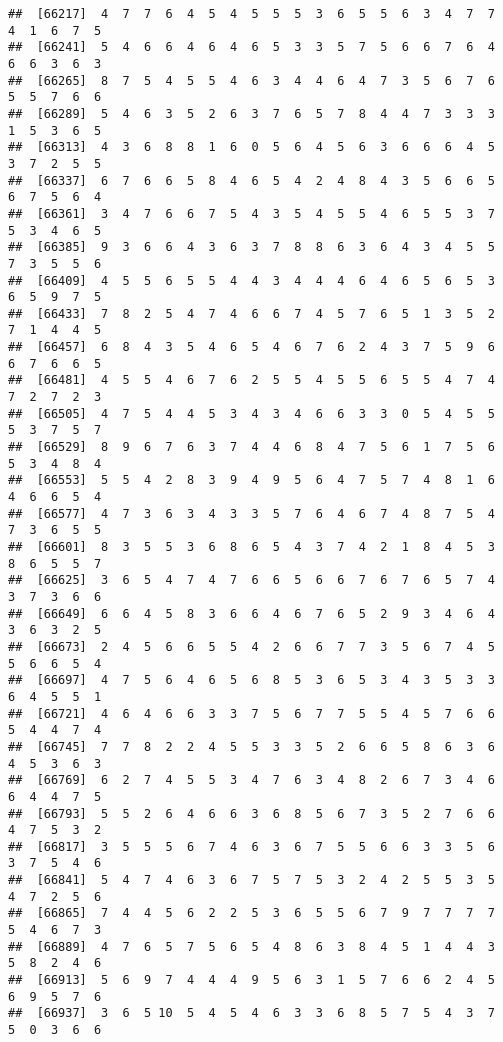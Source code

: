 \documentclass[
]{book}
\begin{document}
\begin{verbatim}
##  [66217]  4  7  7  6  4  5  4  5  5  5  3  6  5  5  6  3  4  7  7  4  1  6  7  5
##  [66241]  5  4  6  6  4  6  4  6  5  3  3  5  7  5  6  6  7  6  4  6  6  3  6  3
##  [66265]  8  7  5  4  5  5  4  6  3  4  4  6  4  7  3  5  6  7  6  5  5  7  6  6
##  [66289]  5  4  6  3  5  2  6  3  7  6  5  7  8  4  4  7  3  3  3  1  5  3  6  5
##  [66313]  4  3  6  8  8  1  6  0  5  6  4  5  6  3  6  6  6  4  5  3  7  2  5  5
##  [66337]  6  7  6  6  5  8  4  6  5  4  2  4  8  4  3  5  6  6  5  6  7  5  6  4
##  [66361]  3  4  7  6  6  7  5  4  3  5  4  5  5  4  6  5  5  3  7  5  3  4  6  5
##  [66385]  9  3  6  6  4  3  6  3  7  8  8  6  3  6  4  3  4  5  5  7  3  5  5  6
##  [66409]  4  5  5  6  5  5  4  4  3  4  4  4  6  4  6  5  6  5  3  6  5  9  7  5
##  [66433]  7  8  2  5  4  7  4  6  6  7  4  5  7  6  5  1  3  5  2  7  1  4  4  5
##  [66457]  6  8  4  3  5  4  6  5  4  6  7  6  2  4  3  7  5  9  6  6  7  6  6  5
##  [66481]  4  5  5  4  6  7  6  2  5  5  4  5  5  6  5  5  4  7  4  7  2  7  2  3
##  [66505]  4  7  5  4  4  5  3  4  3  4  6  6  3  3  0  5  4  5  5  5  3  7  5  7
##  [66529]  8  9  6  7  6  3  7  4  4  6  8  4  7  5  6  1  7  5  6  5  3  4  8  4
##  [66553]  5  5  4  2  8  3  9  4  9  5  6  4  7  5  7  4  8  1  6  4  6  6  5  4
##  [66577]  4  7  3  6  3  4  3  3  5  7  6  4  6  7  4  8  7  5  4  7  3  6  5  5
##  [66601]  8  3  5  5  3  6  8  6  5  4  3  7  4  2  1  8  4  5  3  8  6  5  5  7
##  [66625]  3  6  5  4  7  4  7  6  6  5  6  6  7  6  7  6  5  7  4  3  7  3  6  6
##  [66649]  6  6  4  5  8  3  6  6  4  6  7  6  5  2  9  3  4  6  4  3  6  3  2  5
##  [66673]  2  4  5  6  6  5  5  4  2  6  6  7  7  3  5  6  7  4  5  5  6  6  5  4
##  [66697]  4  7  5  6  4  6  5  6  8  5  3  6  5  3  4  3  5  3  3  6  4  5  5  1
##  [66721]  4  6  4  6  6  3  3  7  5  6  7  7  5  5  4  5  7  6  6  5  4  4  7  4
##  [66745]  7  7  8  2  2  4  5  5  3  3  5  2  6  6  5  8  6  3  6  4  5  3  6  3
##  [66769]  6  2  7  4  5  5  3  4  7  6  3  4  8  2  6  7  3  4  6  6  4  4  7  5
##  [66793]  5  5  2  6  4  6  6  3  6  8  5  6  7  3  5  2  7  6  6  4  7  5  3  2
##  [66817]  3  5  5  5  6  7  4  6  3  6  7  5  5  6  6  3  3  5  6  3  7  5  4  6
##  [66841]  5  4  7  4  6  3  6  7  5  7  5  3  2  4  2  5  5  3  5  4  7  2  5  6
##  [66865]  7  4  4  5  6  2  2  5  3  6  5  5  6  7  9  7  7  7  7  5  4  6  7  3
##  [66889]  4  7  6  5  7  5  6  5  4  8  6  3  8  4  5  1  4  4  3  5  8  2  4  6
##  [66913]  5  6  9  7  4  4  4  9  5  6  3  1  5  7  6  6  2  4  5  6  9  5  7  6
##  [66937]  3  6  5 10  5  4  5  4  6  3  3  6  8  5  7  5  4  3  7  5  0  3  6  6

\end{verbatim}
\end{document}
